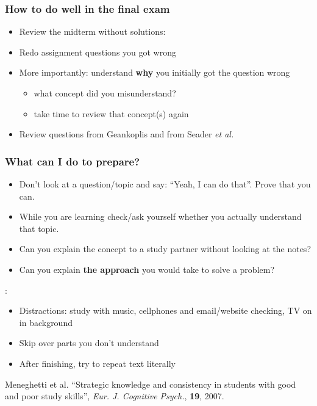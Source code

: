 \begin{frame}\frametitle{How to do well in the final exam}
	\begin{itemize}
		\item	Review the midterm without solutions: \emph{{\color{myOrange}{it should be easy now}}}
		\item	Redo assignment questions you got wrong
		\item	More importantly: understand \textbf{why} you initially got the question wrong
			\begin{itemize}
				\item	what concept did you misunderstand?
				\item	take time to review that concept(s) again
			\end{itemize}
		\item	Review questions from Geankoplis and from Seader \emph{et al.}
	\end{itemize}
\end{frame}

\begin{frame}\frametitle{What can I do to prepare?}
	\textbf{{}}
	\begin{itemize}
		\item	Don't look at a question/topic and say: ``Yeah, I can do that''. Prove that you can.
		\item	While you are learning check/ask yourself whether you actually understand that topic.
		\item	Can you explain the concept to a study partner without looking at the notes?
		\item	Can you explain \textbf{the approach} you would take to solve a problem?
	\end{itemize}
	\textbf{{\color{myRed}{Poor students do this*}}}:
	\begin{itemize}
		\item	Distractions: study with music, cellphones and email/website checking, TV on in background
		\item	Skip over parts you don't understand
		\item	After finishing, try to repeat text literally
	\end{itemize}
	\textbf{{\color{myRed}{*}}}{\tiny Meneghetti et al. ``Strategic knowledge and consistency in students with good and poor study skills'', \emph{Eur. J. Cognitive Psych.}, \textbf{19}, 2007.}
\end{frame}

